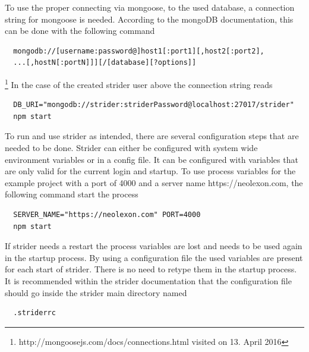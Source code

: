 To use the proper connecting via mongoose, to the used database, a connection string for mongoose is needed. According to the mongoDB
documentation, this can be done with the following command
\begin{lstlisting}
  mongodb://[username:password@]host1[:port1][,host2[:port2],
  ...[,hostN[:portN]]][/[database][?options]]
\end{lstlisting}
\footnote{http://mongoosejs.com/docs/connections.html visited on 13. April 2016}
In the case of the created strider user above the connection string reads
\begin{lstlisting}
  DB_URI="mongodb://strider:striderPassword@localhost:27017/strider"
  npm start
\end{lstlisting}

To run and use strider as intended, there are several configuration steps that are needed to be done. Strider can either be configured
with system wide environment variables or in a config file. It can be configured with variables that are only valid for the current login and
startup. To use process variables for the example project with a port of 4000 and a server name https://neolexon.com, the following
command start the process

\begin{lstlisting}
  SERVER_NAME="https://neolexon.com" PORT=4000
  npm start
\end{lstlisting}

If strider needs a restart the process variables are lost and needs to be used again in the startup process. By using a configuration file
the used variables are present for each start of strider. There is no need to retype them in the startup process. It is recommended within
the strider documentation that the configuration file should go inside the strider main directory named

\begin{lstlisting}
  .striderrc
\end{lstlisting}

